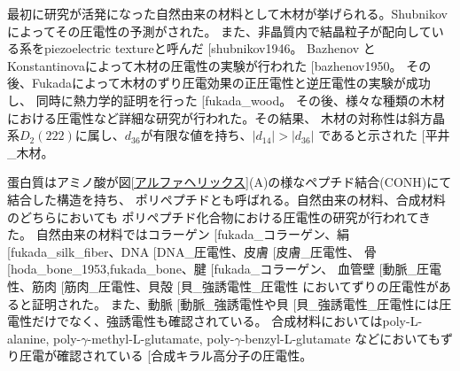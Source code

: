 \documentclass[dvipdfmx,12pt,a4paper]{jreport}
\makeatletter
\DeclareRobustCommand\cite{\unskip
    	\@ifnextchar[{\@tempswatrue\@citex}{\@tempswafalse\@citex[]}}
\makeatother
\begin{document}
			最初に研究が活発になった自然由来の材料として木材が挙げられる。Shubnikovによってその圧電性の予測がされた。
			また、非晶質内で結晶粒子が配向している系をpiezoelectric textureと呼んだ\cite{shubnikov1946}。
			Bazhenov と Konstantinovaによって木材の圧電性の実験が行われた\cite{bazhenov1950}。
			その後、Fukadaによって木材のずり圧電効果の正圧電性と逆圧電性の実験が成功し、
			同時に熱力学的証明を行った\cite{fukada_wood}。
			その後、様々な種類の木材における圧電性など詳細な研究が行われた。その結果、
			木材の対称性は斜方晶系$D_2(222)$に属し、$d_{36}$が有限な値を持ち、$|d_{14}|>|d_{36}|$
			であると示された\cite{平井_木材}。

			蛋白質はアミノ酸が図\ref{アルファヘリックス}(A)の様なペプチド結合(CONH)にて結合した構造を持ち、
			ポリペプチドとも呼ばれる。自然由来の材料、合成材料のどちらにおいても
			ポリペプチド化合物における圧電性の研究が行われてきた。
			自然由来の材料ではコラーゲン\cite{fukada_コラーゲン}、絹\cite{fukada_silk_fiber}、DNA\cite{DNA_圧電性}、皮膚\cite{皮膚_圧電性}、
			骨\cite{hoda_bone_1953,fukada_bone}、腱\cite{fukada_コラーゲン}、
			血管壁\cite{動脈_圧電性}、筋肉\cite{筋肉_圧電性}、貝殻\cite{貝_強誘電性_圧電性}
			においてずりの圧電性があると証明された。
			また、動脈\cite{動脈_強誘電性}や貝\cite{貝_強誘電性_圧電性}には圧電性だけでなく、強誘電性も確認されている。
			合成材料においてはpoly-L-alanine, poly-$\gamma$-methyl-L-glutamate, poly-$\gamma$-benzyl-L-glutamate
			などにおいてもずり圧電が確認されている\cite{合成キラル高分子の圧電性}。
\end{document}
